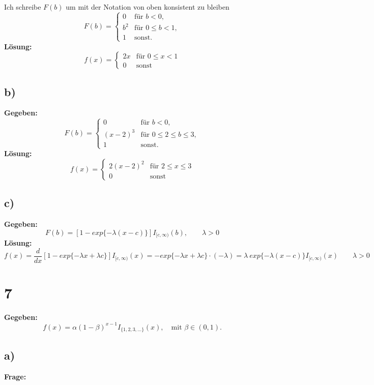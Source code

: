 \documentclass{article}
\begin{document}
Ich schreibe $F(b)$ um mit der Notation von oben konsistent zu bleiben
\[
F(b) = \begin{cases}
    0 & \text{für } b < 0, \\
    b^2 & \text{für } 0 \leq b < 1, \\
    1 & \text{sonst.}
\end{cases}
\]
\textbf{Lösung:} \\
\[
f(x) = \begin{cases}
    2x & \text{für } 0 \leq x < 1 \\
    0 & \text{sonst } 
\end{cases}
\]
\subsection*{b)}
\textbf{Gegeben:} \\

\[
F(b) = \begin{cases}
    0 & \text{für } b < 0, \\
    (x-2)^3 & \text{für } 0 \leq 2 \leq b \leq 3, \\
    1 & \text{sonst.}
\end{cases}
\]
\textbf{Lösung:} \\
\[
f(x) = \begin{cases}
    2(x-2)^2 & \text{für } 2 \leq x \leq 3 \\
    0 & \text{sonst } 
\end{cases}
\]

\subsection*{c)}
\textbf{Gegeben:} \\

\[
F(b) = [1 - exp\{-\lambda (x-c)\}] I_{[c, \infty)}(b), \qquad \lambda > 0
\]
\textbf{Lösung:} \\
\[
f(x) = \frac{d}{dx} [1 - exp\{-\lambda x + \lambda c\}] I_{[c, \infty)}(x) = -exp\{-\lambda x + \lambda c\} \cdot  (-\lambda) = \lambda ~exp\{-\lambda (x -c)\} I_{[c, \infty)}(x) \qquad  \lambda > 0
\]

\section*{7}
\textbf{Gegeben:} \\

\[f(x) = \alpha(1-\beta)^{x-1} I_{\{1,2,3,\ldots\}}(x),\quad \text{mit } \beta \in (0,1). \]
\subsection*{a)}
\textbf{Frage:}\\
\end{document}
